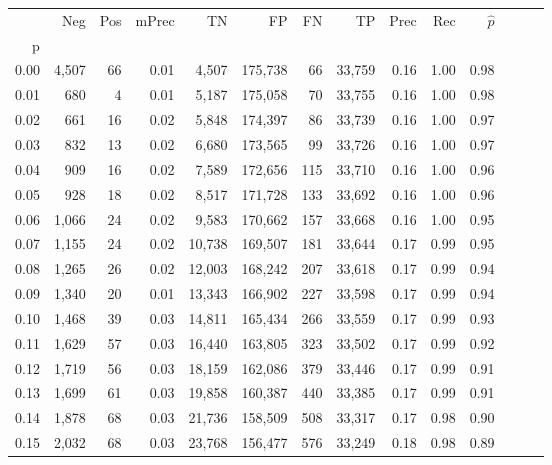 \begin{tabular}{rrrrrrrrrrrrrr}
\toprule
{} &    Neg &  Pos & mPrec &       TN &       FP &      FN &      TP &  Prec &   Rec & $\hat{p}$ \\
p    &        &      &       &          &          &         &         &       &       &           \\
\midrule
0.00 &  4,507 &   66 &  0.01 &    4,507 &  175,738 &      66 &  33,759 &  0.16 &  1.00 &      0.98 \\
0.01 &    680 &    4 &  0.01 &    5,187 &  175,058 &      70 &  33,755 &  0.16 &  1.00 &      0.98 \\
0.02 &    661 &   16 &  0.02 &    5,848 &  174,397 &      86 &  33,739 &  0.16 &  1.00 &      0.97 \\
0.03 &    832 &   13 &  0.02 &    6,680 &  173,565 &      99 &  33,726 &  0.16 &  1.00 &      0.97 \\
0.04 &    909 &   16 &  0.02 &    7,589 &  172,656 &     115 &  33,710 &  0.16 &  1.00 &      0.96 \\
0.05 &    928 &   18 &  0.02 &    8,517 &  171,728 &     133 &  33,692 &  0.16 &  1.00 &      0.96 \\
0.06 &  1,066 &   24 &  0.02 &    9,583 &  170,662 &     157 &  33,668 &  0.16 &  1.00 &      0.95 \\
0.07 &  1,155 &   24 &  0.02 &   10,738 &  169,507 &     181 &  33,644 &  0.17 &  0.99 &      0.95 \\
0.08 &  1,265 &   26 &  0.02 &   12,003 &  168,242 &     207 &  33,618 &  0.17 &  0.99 &      0.94 \\
0.09 &  1,340 &   20 &  0.01 &   13,343 &  166,902 &     227 &  33,598 &  0.17 &  0.99 &      0.94 \\
0.10 &  1,468 &   39 &  0.03 &   14,811 &  165,434 &     266 &  33,559 &  0.17 &  0.99 &      0.93 \\
0.11 &  1,629 &   57 &  0.03 &   16,440 &  163,805 &     323 &  33,502 &  0.17 &  0.99 &      0.92 \\
0.12 &  1,719 &   56 &  0.03 &   18,159 &  162,086 &     379 &  33,446 &  0.17 &  0.99 &      0.91 \\
0.13 &  1,699 &   61 &  0.03 &   19,858 &  160,387 &     440 &  33,385 &  0.17 &  0.99 &      0.91 \\
0.14 &  1,878 &   68 &  0.03 &   21,736 &  158,509 &     508 &  33,317 &  0.17 &  0.98 &      0.90 \\
0.15 &  2,032 &   68 &  0.03 &   23,768 &  156,477 &     576 &  33,249 &  0.18 &  0.98 &      0.89 \\

\end{tabular}

